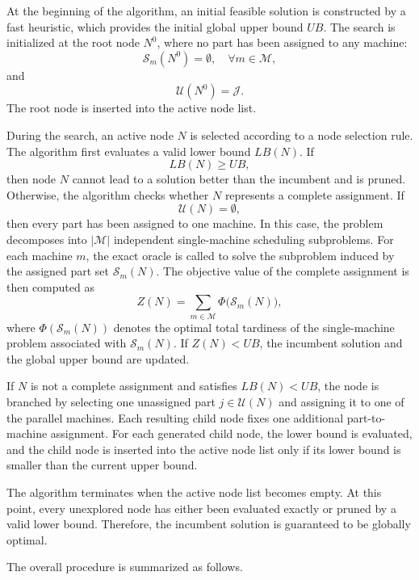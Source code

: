 \documentclass[review,3p,times,authoryear]{elsarticle}
\begin{document}
At the beginning of the algorithm, an initial feasible solution is
constructed by a fast heuristic, which provides the initial global upper
bound $UB$. The search is initialized at the root node $N^0$, where no part
has been assigned to any machine:
\[
\mathcal{S}_m(N^0)=\emptyset,\quad \forall m\in\mathcal{M},
\]
and
\[
\mathcal{U}(N^0)=\mathcal{J}.
\]
The root node is inserted into the active node list.

During the search, an active node $N$ is selected according to a node
selection rule. The algorithm first evaluates a valid lower bound $LB(N)$.
If
\[
LB(N)\ge UB,
\]
then node $N$ cannot lead to a solution better than the incumbent and is
pruned. Otherwise, the algorithm checks whether $N$ represents a complete
assignment. If
\[
\mathcal{U}(N)=\emptyset,
\]
then every part has been assigned to one machine. In this case, the problem
decomposes into $|\mathcal{M}|$ independent single-machine scheduling
subproblems. For each machine $m$, the exact oracle is called to solve the
subproblem induced by the assigned part set $\mathcal{S}_m(N)$. The objective
value of the complete assignment is then computed as
\[
Z(N)=\sum_{m\in\mathcal{M}}\Phi\bigl(\mathcal{S}_m(N)\bigr),
\]
where $\Phi(\mathcal{S}_m(N))$ denotes the optimal total tardiness of the
single-machine problem associated with $\mathcal{S}_m(N)$. If $Z(N)<UB$,
the incumbent solution and the global upper bound are updated.

If $N$ is not a complete assignment and satisfies $LB(N)<UB$, the node is
branched by selecting one unassigned part $j\in\mathcal{U}(N)$ and assigning
it to one of the parallel machines. Each resulting child node fixes one
additional part-to-machine assignment. For each generated child node, the
lower bound is evaluated, and the child node is inserted into the active
node list only if its lower bound is smaller than the current upper bound.

The algorithm terminates when the active node list becomes empty. At this
point, every unexplored node has either been evaluated exactly or pruned by
a valid lower bound. Therefore, the incumbent solution is guaranteed to be
globally optimal.

The overall procedure is summarized as follows.
\end{document}

